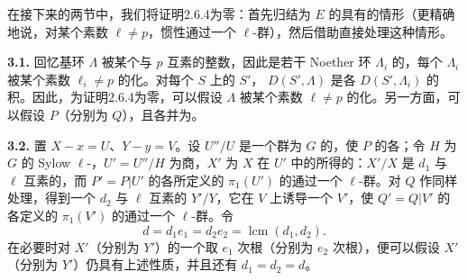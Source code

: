 在接下来的两节中，我们将证明2.6.4为零：首先归结为 $E$ 的具有的情形（更精确地说，对某个素数 $\ell\ne p$，惯性通过一个 $\ell$-群），然后借助直接处理这种情形。

\textbf{3.1.} 回忆基环 $\Lambda$ 被某个与 $p$ 互素的整数，因此是若干 Noether 环 $\Lambda_i$ 的，每个 $\Lambda_i$ 被某个素数 $\ell_i\ne p$ 的化。对每个 $S$ 上的 $S'$， $D(S',\Lambda)$ 是各 $D(S',\Lambda_i)$ 的积。因此，为证明2.6.4为零，可以假设 $\Lambda$ 被某个素数 $\ell\ne p$ 的化。另一方面，可以假设 $P$（分别为 $Q$），且各并为。

\textbf{3.2.} 置 $X-x=U$、$Y-y=V$。设 $U''/U$ 是一个群为 $G$ 的，使 $P$ 的各；令 $H$ 为 $G$ 的 Sylow $\ell$-，$U'=U''/H$ 为商，$X'$ 为 $X$ 在 $U'$ 中的所得的：$X'/X$ 是 $d_1$ 与 $\ell$ 互素的，而 $P'=P|U'$ 的各所定义的 $\pi_1(U')$ 的通过一个 $\ell$-群。对 $Q$ 作同样处理，得到一个 $d_2$ 与 $\ell$ 互素的 $Y'/Y$，它在 $V$ 上诱导一个 $V'$，使 $Q'=Q|V'$ 的各定义的 $\pi_1(V')$ 的通过一个 $\ell$-群。令
\[
 d=d_1e_1=d_2e_2=\operatorname{lcm}(d_1,d_2).
\]
在必要时对 $X'$（分别为 $Y'$）的一个取 $e_1$ 次根（分别为 $e_2$ 次根），便可以假设 $X'$（分别为 $Y'$）仍具有上述性质，并且还有 $d_1=d_2=d$。

